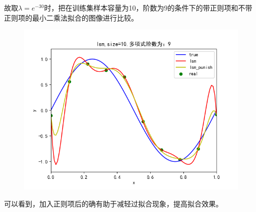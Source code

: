 \documentclass[lang=cn,a4paper,cite=authoryear]{elegantpaper}
\begin{document}
故取$\lambda =e^{-30}$时，把在训练集样本容量为10，阶数为9的条件下的带正则项和不带正则项的最小二乘法拟合的图像进行比较。
    \begin{figure}[H]
	\centering
	\includegraphics[scale=0.5]{10}
\end{figure}
可以看到，加入正则项后的确有助于减轻过拟合现象，提高拟合效果。
\end{document}
